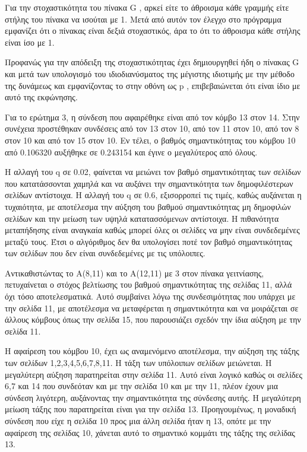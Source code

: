 \documentclass[a4paper,11pt]{article}
\newcommand{\lt}{\latintext}
\newcommand{\gt}{\greektext}
\begin{document}
Για την στοχαστικότητα του πίνακα \lt G \gt, αρκεί είτε το άθροισμα κάθε γραμμής είτε
στήλης του πίνακα να ισούται με 1. Μετά από αυτόν τον έλεγχο στο πρόγραμμα 
εμφανίζει ότι ο πίνακας είναι δεξιά στοχαστικός, άρα το ότι το άθροισμα κάθε στήλης 
είναι ίσο με 1. \par
Προφανώς για την απόδειξη της στοχαστικότητας έχει δημιουργηθεί ήδη ο πίνακας \lt G 
\gt και μετά των υπολογισμό του ιδιοδιανύσματος της μέγιστης ιδιοτιμής με την μέθοδο
της δυνάμεως και εμφανίζοντας το στην οθόνη ως \lt p \gt, επιβεβαιώνεται ότι είναι 
ίδιο με αυτό της εκφώνησης. \par
Για το ερώτημα 3, η σύνδεση που αφαιρέθηκε είναι από τον κόμβο 13 στον 14. Στην 
συνέχεια προστέθηκαν συνδέσεις από τον 13 στον 10, από τον 11 στον 10, από τον 8 
στον 10 και από τον 15 στον 10. Εν τέλει, ο βαθμός σημαντικότητας του κόμβου 10 από 
0.106320 αυξήθηκε σε 0.243154 και έγινε ο μεγαλύτερος από όλους.
\par
Η αλλαγή του \lt q \gt σε 0.02, φαίνεται να μειώνει τον βαθμό σημαντικότητας των σελίδων που κατατάσσονται 
χαμηλά και να αυξάνει την σημαντικότητα των δημοφιλέστερων σελίδων αντίστοιχα. Η αλλαγή του \lt q \gt σε 0.6, εξισορροπεί τις τιμές, καθώς αυξάνεται η τυχαιότητα, με 
αποτέλεσμα την αύξηση του βαθμού σημαντικότητας μη δημοφιλών σελίδων και την μείωση
των υψηλά κατατασσόμενων αντίστοιχα. Η πιθανότητα μεταπήδησης είναι αναγκαία καθώς μπορεί όλες οι σελίδες να μην είναι συνδεδεμένες μεταξύ τους. Έτσι ο αλγόριθμος δεν θα υπολογίσει ποτέ τον βαθμό σημαντικότητας των σελίδων που δεν είναι συνδεδεμένες με τις υπόλοιπες. \par
Aντικαθιστώντας το A(8,11) και το A(12,11) με 3 στον πίνακα γειτνίασης, πετυχαίνεται ο
στόχος βελτίωσης του βαθμού σημαντικότητας της σελίδας 11, αλλά όχι τόσο
αποτελεσματικά. Αυτό συμβαίνει λόγω της συνδεσιμότητας που υπάρχει με την σελίδα
11, με αποτέλεσμα να μεταφέρεται η σημαντικότητα και να μοιράζεται σε άλλους κόμβους
όπως την σελίδα 15, που παρουσιάζει σχεδόν την ίδια αύξηση με την σελίδα 11. \par
Η αφαίρεση του κόμβου 10, έχει ως αναμενόμενο αποτέλεσμα, την αύξηση της 
τάξης των σελίδων 1,2,3,4,5,6,7,8,11. Η τάξη των υπόλοιπων σελίδων 
μειώνεται. Η μεγαλύτερη αύξηση παρατηρείται στην σελίδα 11. Αυτό είναι 
λογικό καθώς οι σελίδες  6,7 και 14 που συνδεόταν και με την σελίδα 10 και 
με την 11, πλέον έχουν μια σύνδεση λιγότερη, αυξάνοντας την σημαντικότητα 
της σύνδεσης αυτής. Η μεγαλύτερη μείωση τάξης που παρατηρείται είναι για την
σελίδα 13. Προηγουμένως, η μοναδική σύνδεση που είχε η σελίδα 10 προς μια 
άλλη σελίδα ήταν η 13, οπότε με την αφαίρεση της σελίδας 10, χάνεται αυτό το 
σημαντικό κομμάτι της τάξης της σελίδας 13.




\end{document}
